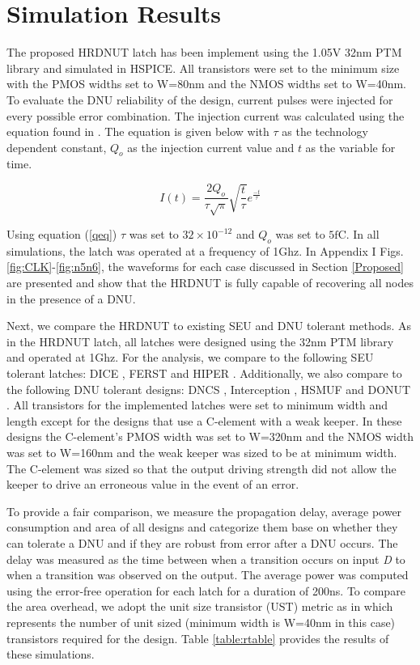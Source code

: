 \section{Simulation Results} \label{sec:res}
The proposed HRDNUT latch has been implement using the 1.05V 32nm PTM library \cite{PTM} and simulated in HSPICE. All transistors were set to the minimum size with the PMOS widths set to W=80nm and the NMOS widths set to W=40nm. To evaluate the DNU reliability of the design, current pulses were injected for every possible error combination. The injection current was calculated using the equation found in \cite{injeq}. The equation is given below with $\tau$ as the technology dependent constant, $Q_o$ as the injection current value and $t$ as the variable for time. 

\begin{equation}\label{qeq}
I(t)=\frac{2Q_o}{\tau\sqrt{\pi}}\sqrt{\frac{t}{\tau}}e^{\frac{-t}{\tau}}
\end{equation}

Using equation (\ref{qeq}) $\tau$ was set to $32\times10^{-12}$ and $Q_o$ was set to $5\text{fC}$. In all simulations, the latch was operated at a frequency of 1Ghz. In Appendix I Figs. \ref{fig:CLK}-\ref{fig:n5n6}, the waveforms for each case discussed in Section \ref{Proposed} are presented and show that the HRDNUT is fully capable of recovering all nodes in the presence of a DNU. 

Next, we compare the HRDNUT to existing SEU and DNU tolerant methods. As in the HRDNUT latch, all latches were designed using the 32nm PTM library and operated at 1Ghz. For the analysis, we compare to the following SEU tolerant latches: DICE \cite{DICE}, FERST \cite{FERST} and HIPER \cite{HIPER}. Additionally, we also compare to the following DNU tolerant designs: DNCS \cite{DNCS}, Interception \cite{Inter}, HSMUF \cite{HSMUF} and DONUT \cite{DONUT}. All transistors for the implemented latches were set to minimum width and length except for the designs that use a C-element with a weak keeper. In these designs the C-element's PMOS width was set to W=320nm and the NMOS width was set to W=160nm and the weak keeper was sized to be at minimum width. The C-element was sized so that the output driving strength did not allow the keeper to drive an erroneous value in the event of an error. 

To provide a fair comparison, we measure the propagation delay, average power consumption and area of all designs and categorize them base on whether they can tolerate a DNU and if they are robust from error after a DNU occurs. The delay was measured as the time between when a transition occurs on input \textit{D} to when a transition was observed on the output. The average power was computed using the error-free operation for each latch for a duration of 200ns. To compare the area overhead, we adopt the unit size transistor (UST) metric as in \cite{DNCS} which represents the number of unit sized (minimum width is W=40nm in this case) transistors required for the design. Table \ref{table:rtable} provides the results of these simulations.

